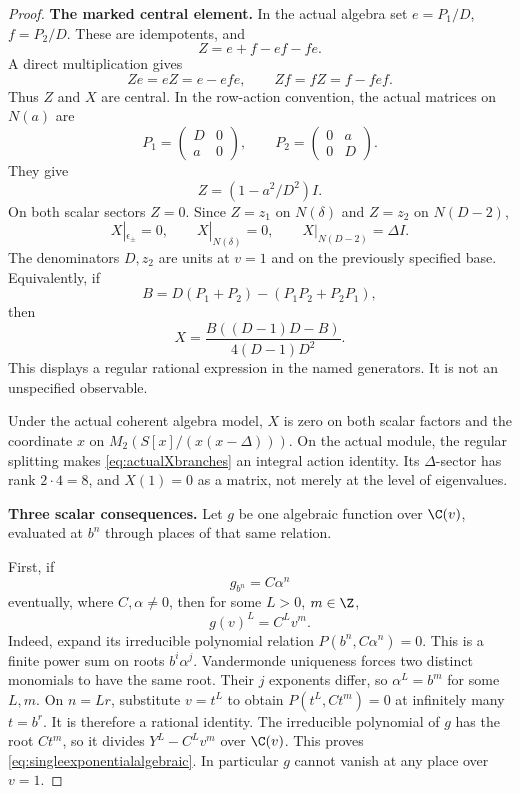 \begin{proof}
\par\smallskip\noindent\textbf{The marked central element.}\quad
In the actual algebra set $e=P_1/D$, $f=P_2/D$.
These are idempotents, and
\[
 Z=e+f-ef-fe.
\]
A direct multiplication gives
\[
 Ze=eZ=e-efe,\qquad Zf=fZ=f-fef.
\]
Thus $Z$ and $X$ are central.
In the row-action convention, the actual matrices on $N(a)$
are
\[
 P_1=\begin{pmatrix}D&0\\a&0\end{pmatrix},\qquad
 P_2=\begin{pmatrix}0&a\\0&D\end{pmatrix}.
\]
They give
\[
 Z=(1-a^2/D^2)I.
\]
On both scalar sectors $Z=0$.
Since $Z=z_1$ on $N(\delta)$ and $Z=z_2$ on $N(D-2)$,
\begin{equation}\label{eq:actualXbranches}
 X|_{\epsilon_\pm}=0,\qquad
 X|_{N(\delta)}=0,\qquad
 X|_{N(D-2)}=\Delta I.
\end{equation}
The denominators $D,z_2$ are units at $v=1$ and on
the previously specified base.
Equivalently, if
\[
 B=D(P_1+P_2)-(P_1P_2+P_2P_1),
\]
then
\[
 X=\frac{B((D-1)D-B)}{4(D-1)D^2}.
\]
This displays a regular rational expression in the named
generators. It is not an unspecified observable.

Under the actual coherent algebra model, $X$ is zero
on both scalar factors and the coordinate $x$ on
$M_2(S[x]/(x(x-\Delta)))$.
On the actual module, the regular  splitting
makes \eqref{eq:actualXbranches} an integral action identity.
Its $\Delta$-sector has rank $2\cdot4=8$, and $X(1)=0$
as a matrix, not merely at the level of eigenvalues.

\par\smallskip\noindent\textbf{Three scalar consequences.}\quad
Let $g$ be one algebraic function over $\C(v)$,
evaluated at $b^n$ through places of that same relation.

First, if
\[
 g_{b^n}=C\alpha^n
\]
eventually, where $C,\alpha\ne0$, then for some
$L>0$, $m\in\Z$,
\begin{equation}\label{eq:singleexponentialalgebraic}
 g(v)^L=C^L v^m.
\end{equation}
Indeed, expand its irreducible polynomial relation
$P(b^n,C\alpha^n)=0$.
This is a finite power sum on roots $b^i\alpha^j$.
Vandermonde uniqueness forces two distinct monomials
to have the same root. Their $j$ exponents differ,
so $\alpha^L=b^m$ for some $L,m$.
On $n=Lr$, substitute $v=t^L$ to obtain
$P(t^L,Ct^m)=0$ at infinitely many $t=b^r$.
It is therefore a rational identity.
The irreducible polynomial of $g$ has the root $Ct^m$,
so it divides $Y^L-C^Lv^m$ over $\C(v)$.
This proves \eqref{eq:singleexponentialalgebraic}.
In particular $g$ cannot vanish at any place over $v=1$.


\end{proof}
